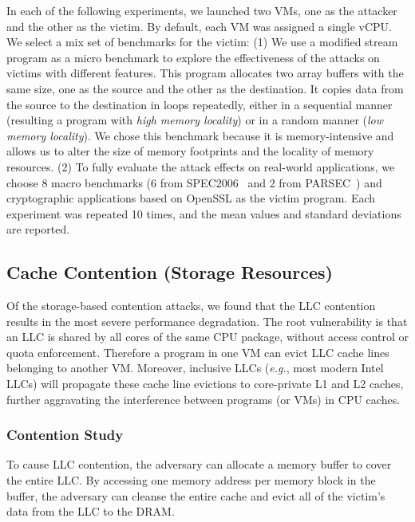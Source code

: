 \documentclass{sig-alternate}
\newcommand{\bheading}[1]{{\vspace{2pt}\noindent{\textbf{#1}}\hspace{2pt}}}
\newcommand{\eg}{\emph{e.g.}\xspace}
\begin{document}
In each of the following experiments, we launched two VMs, one as the attacker 
and the other as the victim. By default, each VM was assigned a single vCPU. We 
select a mix set of benchmarks for the victim: (1) We use a modified stream 
program \cite{stream_benchmark, MoMu:07} as a micro benchmark to explore the effectiveness 
of the attacks on victims with different features. This program 
allocates two array buffers with the same size, one as the source and the other 
as the destination. It copies data from the source to the destination in loops 
repeatedly, either in a sequential manner (resulting a program with \textit{high 
memory locality}) or in a random manner (\textit{low memory locality}). We chose 
this benchmark because it is memory-intensive and allows us to alter the size of 
memory footprints and the locality of memory resources. (2) To fully evaluate the 
attack effects on real-world applications, we choose 8 macro benchmarks (6 from 
SPEC2006~\cite{SPEC2006} and 2 from PARSEC~\cite{Bi:11}) and cryptographic 
applications based on OpenSSL as the victim program. Each experiment was repeated 
10 times, and the mean values and standard deviations are reported.


\subsection{Cache Contention (Storage Resources)}
\label{sec:uncore_cache_contention}

Of the storage-based contention attacks, we found that the LLC contention 
results in the most severe performance degradation. The root vulnerability is that 
an LLC is shared by all cores of the same CPU package, without access control or 
quota enforcement.  Therefore a program in one VM can evict LLC cache lines 
belonging to another VM. Moreover, inclusive LLCs (\eg, most modern Intel LLCs) 
will propagate these cache line evictions to core-private L1 and L2 caches, 
further aggravating the interference between programs (or VMs) in CPU caches. 

\subsubsection{Contention Study}

\bheading{Cache cleansing.}
To cause LLC contention, the adversary can allocate a memory buffer to cover the 
entire LLC. By accessing one memory address per memory block in the buffer, the 
adversary can cleanse the entire cache and evict all of the victim's data from the 
LLC to the DRAM. 
\end{document}
